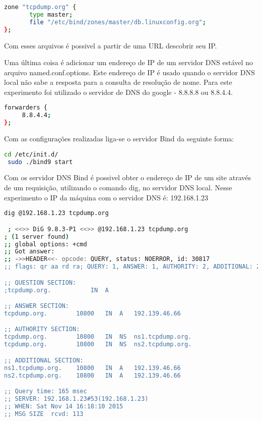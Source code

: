 \documentclass[a4paper]{report} %
\begin{document}
\begin{lstlisting}[language=bash]
zone "tcpdump.org" {
       type master;
       file "/etc/bind/zones/master/db.linuxconfig.org";
};
\end{lstlisting}

Com esses arquivos é possivel a partir de uma URL descobrir seu IP.

Uma última coisa é adicionar um endereço de IP de um servidor DNS estável no arquivo named.conf.options. Este endereço de IP é usado quando o servidor DNS local não sabe a resposta para a consulta de resolução de nome. Para este experimento foi utilizado o servidor de DNS do google - 8.8.8.8 ou 8.8.4.4.

\begin{lstlisting}[language=bash]
 forwarders {
     8.8.4.4;
};
\end{lstlisting}

Com as configurações realizadas liga-se o servidor Bind da seguinte forma:

\begin{lstlisting}[language=bash]
 cd /etc/init.d/
 sudo ./bind9 start
\end{lstlisting}

Com os servidor DNS Bind é possivel obter o endereço de IP de um site através de um requisição, utilizando o comando dig, no servidor DNS local. Nesse experimento o IP da máquina com o servidor DNS é: 192.168.1.23

\begin{lstlisting}[language=bash]
 dig @192.168.1.23 tcpdump.org

 ; <<>> DiG 9.8.3-P1 <<>> @192.168.1.23 tcpdump.org
; (1 server found)
;; global options: +cmd
;; Got answer:
;; ->>HEADER<<- opcode: QUERY, status: NOERROR, id: 30817
;; flags: qr aa rd ra; QUERY: 1, ANSWER: 1, AUTHORITY: 2, ADDITIONAL: 2

;; QUESTION SECTION:
;tcpdump.org.			IN	A

;; ANSWER SECTION:
tcpdump.org.		10800	IN	A	192.139.46.66

;; AUTHORITY SECTION:
tcpdump.org.		10800	IN	NS	ns1.tcpdump.org.
tcpdump.org.		10800	IN	NS	ns2.tcpdump.org.

;; ADDITIONAL SECTION:
ns1.tcpdump.org.	10800	IN	A	192.139.46.66
ns2.tcpdump.org.	10800	IN	A	192.139.46.66

;; Query time: 165 msec
;; SERVER: 192.168.1.23#53(192.168.1.23)
;; WHEN: Sat Nov 14 16:18:10 2015
;; MSG SIZE  rcvd: 113
\end{lstlisting}
\end{document}
